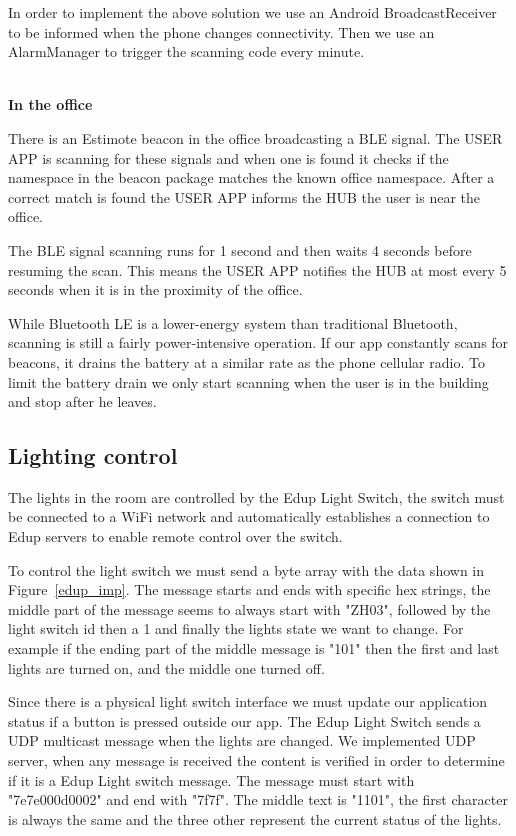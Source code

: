 In order to implement the above solution we use an Android BroadcastReceiver to be informed when the phone changes connectivity. Then we use an AlarmManager to trigger the scanning code every minute.

\mbox{}\\
\textbf{In the office}

There is an Estimote beacon in the office broadcasting a \ac{BLE} signal. The USER APP is scanning for these signals and when one is found it checks if the namespace in the beacon package matches the known office namespace. After a correct match is found the USER APP informs the HUB the user is near the office.

The \ac{BLE} signal scanning runs for 1 second and then waits 4 seconds before resuming the scan. This means the USER APP notifies the HUB at most every 5 seconds when it is in the proximity of the office.

While Bluetooth LE is a lower-energy system than traditional Bluetooth, scanning is still a fairly power-intensive operation. If our app constantly scans for beacons, it drains the battery at a similar rate as the phone cellular radio. To limit the battery drain we only start scanning when the user is in the building and stop after he leaves.

\subsection{Lighting control}\label{light_imp}


The lights in the room are controlled by the Edup Light Switch, the switch must be connected to a WiFi network and automatically establishes a connection to Edup servers to enable remote control over the switch.

To control the light switch we must send a byte array with the data shown in Figure~\ref{edup_imp}.
The message starts and ends with specific hex strings, the middle part of the message seems to always start with "ZH03", followed by the light switch id then a 1 and finally the lights state we want to change. For example if the ending part of the middle message is "101" then the first and last lights are turned on, and the middle one turned off.

Since there is a physical light switch interface we must update our application status if a button is pressed outside our app.
The Edup Light Switch sends a \ac{UDP} multicast message when the lights are changed. We implemented \ac{UDP} server, when any message is received the content is verified in order to determine if it is a Edup Light switch message. The message must start with "7e7e000d0002" and end with "7f7f". The middle text is "1101", the first character is always the same and the three other represent the current status of the lights.

